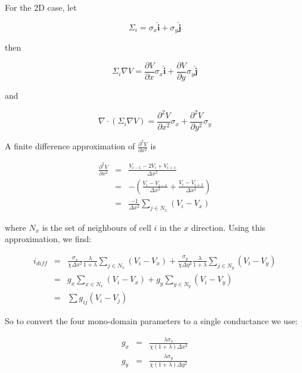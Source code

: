 For the 2D case, let
\begin{linenomath}
\begin{equation}
\Sigma_{i}=\sigma_{x}\hat{\mathbf{i}}+\sigma_{y}\hat{\mathbf{j}}
\end{equation}
\end{linenomath}
then
\begin{linenomath}
\begin{equation}
\Sigma_{i}\nabla V=\frac{\partial V}{\partial x}\sigma_{x}\hat{\mathbf{i}}+\frac{\partial V}{\partial y}\sigma_{y}\hat{\mathbf{j}}
\end{equation}
\end{linenomath}
and
\begin{linenomath}
\begin{equation}
\nabla\cdot\left(\Sigma_{i}\nabla V\right)=\frac{\partial^{2}V}{\partial x^{2}}\sigma_{x}+\frac{\partial^{2}V}{\partial y^{2}}\sigma_{y}
\end{equation}
\end{linenomath}
A finite difference approximation of $\frac{\partial^{2}V}{\partial x^{2}}$
is
\begin{linenomath}
\begin{eqnarray*}
\frac{\partial^{2}V}{\partial x^{2}} & = & \frac{V_{i-1}-2V_{i}+V_{i+1}}{\Delta x^{2}}\\
 & = & -\left(\frac{V_{i}-V_{i-1}}{\Delta x^{2}}+\frac{V_{i}-V_{i+1}}{\Delta x^{2}}\right)\\
 & = & \frac{-1}{\Delta x^{2}}\sum_{j\in N_{x}}\left(V_{i}-V_{x}\right)
\end{eqnarray*}
\end{linenomath}
where $N_{x}$ is the set of neighbours of cell $i$ in the $x$ direction.
Using this approximation, we find:
\begin{linenomath}
\begin{eqnarray*}
i_{\mathit{diff}} & = & \frac{\sigma_{x}}{\chi\Delta x^{2}}\frac{\lambda}{1+\lambda}\sum_{j\in N_{x}}\left(V_{i}-V_{x}\right)+\frac{\sigma_{y}}{\chi\Delta y^{2}}\frac{\lambda}{1+\lambda}\sum_{j\in N_{y}}\left(V_{i}-V_{y}\right)\\
 & = & g_{x}\sum_{x\in N_{x}}\left(V_{i}-V_{x}\right)+g_{y}\sum_{y\in N_{y}}\left(V_{i}-V_{y}\right)\\
 & = & \sum g_{ij}\left(V_{i}-V_{j}\right)
\end{eqnarray*}
\end{linenomath}

So to convert the four mono-domain parameters to a single conductance
we use:
\begin{linenomath}
\begin{eqnarray*}
g_{x} & = & \frac{\lambda\sigma_{x}}{\chi\left(1+\lambda\right)\Delta x^{2}}\\
g_{y} & = & \frac{\lambda\sigma_{y}}{\chi\left(1+\lambda\right)\Delta y^{2}}
\end{eqnarray*}
\end{linenomath}

